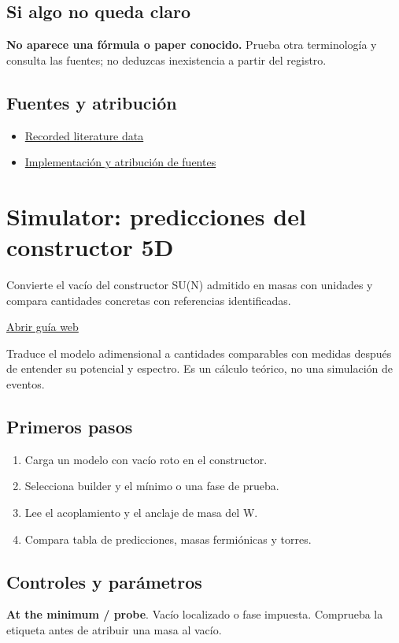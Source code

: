 \documentclass[11pt,a4paper]{article}
\begin{document}
\subsection*{Si algo no queda claro}
\textbf{No aparece una fórmula o paper conocido.} Prueba otra terminología y consulta las fuentes; no deduzcas inexistencia a partir del registro.

\subsection*{Fuentes y atribución}
\begin{itemize}
\item \href{https://github.com/karlesmarin/ghu-lab/blob/main/data/census.json}{Recorded literature data}
\item \href{https://github.com/karlesmarin/ghu-lab/blob/main/src/sections/census_lit_section.js}{Implementación y atribución de fuentes}
\end{itemize}
\section{Simulator: predicciones del constructor 5D}
Convierte el vacío del constructor SU(N) admitido en masas con unidades y compara cantidades concretas con referencias identificadas.

\href{https://karlesmarin.github.io/ghu-explorer/guide/es/simulator-builder/index.html}{Abrir guía web}

Traduce el modelo adimensional a cantidades comparables con medidas después de entender su potencial y espectro. Es un cálculo teórico, no una simulación de eventos.
\subsection*{Primeros pasos}
\begin{enumerate}
\item Carga un modelo con vacío roto en el constructor.
\item Selecciona builder y el mínimo o una fase de prueba.
\item Lee el acoplamiento y el anclaje de masa del W.
\item Compara tabla de predicciones, masas fermiónicas y torres.
\end{enumerate}
\subsection*{Controles y parámetros}
\textbf{At the minimum / probe}. Vacío localizado o fase impuesta. Comprueba la etiqueta antes de atribuir una masa al vacío.
\end{document}
